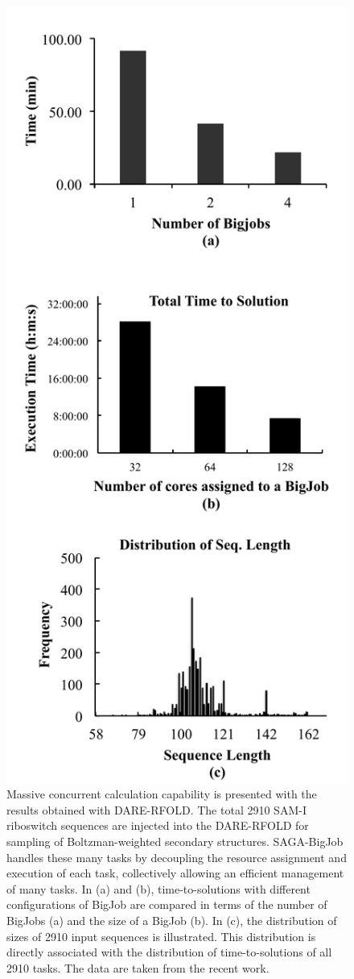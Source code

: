 \documentclass{sig-alternate}
\begin{document}
\begin{figure}
 \centering
\includegraphics[scale=0.40]{figures/dare-rfold-result.pdf}
\caption{\small Massive concurrent calculation capability is presented with the results obtained with DARE-RFOLD. The total 2910 SAM-I riboswitch sequences are injected into the DARE-RFOLD for sampling of Boltzman-weighted secondary structures.  SAGA-BigJob handles these many tasks by decoupling the resource assignment and execution of each task, collectively allowing an efficient management of many tasks. In (a) and (b), time-to-solutions with different configurations of BigJob are compared in terms of the number of BigJobs (a) and the size of a BigJob (b).  In (c), the distribution of sizes of 2910 input sequences is illustrated.  This distribution is directly associated with the distribution of time-to-solutions of all 2910 tasks. The data are taken from the recent work\cite{ccpe11}.}

\end{figure}
\end{document}
